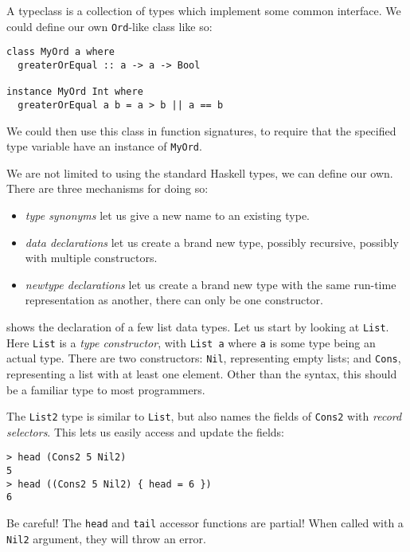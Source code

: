 A typeclass is a collection of types which implement some common interface.  We
could define our own \verb|Ord|-like class like so:

\begin{verbatim}
class MyOrd a where
  greaterOrEqual :: a -> a -> Bool

instance MyOrd Int where
  greaterOrEqual a b = a > b || a == b
\end{verbatim}

We could then use this class in function signatures, to require that the
specified type variable have an instance of \verb|MyOrd|.

We are not limited to using the standard Haskell types, we can define our own.
There are three mechanisms for doing so:

\begin{itemize}
\item \emph{type synonyms} let us give a new name to an existing type.
\item \emph{data declarations} let us create a brand new type, possibly
  recursive, possibly with multiple constructors.
\item \emph{newtype declarations} let us create a brand new type with the same
  run-time representation as another, there can only be one constructor.
\end{itemize}

\begin{figure}
  \centering
  
  \label{fig:list}
  \hrulefill
\end{figure}

 shows the declaration of a few list data types.  Let us start by
looking at \verb|List|.  Here \verb|List| is a \emph{type constructor}, with
\verb|List a| where \verb|a| is some type being an actual type.  There are two
constructors: \verb|Nil|, representing empty lists; and \verb|Cons|,
representing a list with at least one element.  Other than the syntax, this
should be a familiar type to most programmers.

The \verb|List2| type is similar to \verb|List|, but also names the fields of
\verb|Cons2| with \emph{record selectors}.  This lets us easily access and
update the fields:

\begin{verbatim}
> head (Cons2 5 Nil2)
5
> head ((Cons2 5 Nil2) { head = 6 })
6
\end{verbatim}

Be careful!  The \verb|head| and \verb|tail| accessor functions are partial!
When called with a \verb|Nil2| argument, they will throw an error.

